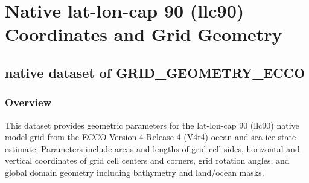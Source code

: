 \section{Native lat-lon-cap 90 (llc90) Coordinates and Grid Geometry}
\subsection{native dataset of GRID\_GEOMETRY\_ECCO}
\newp
\subsubsection{Overview}
This dataset provides geometric parameters for the lat-lon-cap 90 (llc90) native model grid from the ECCO Version 4 Release 4 (V4r4) ocean and sea-ice state estimate. Parameters include areas and lengths of grid cell sides, horizontal and vertical coordinates of grid cell centers and corners, grid rotation angles, and global domain geometry including bathymetry and land/ocean masks.
\\\\
